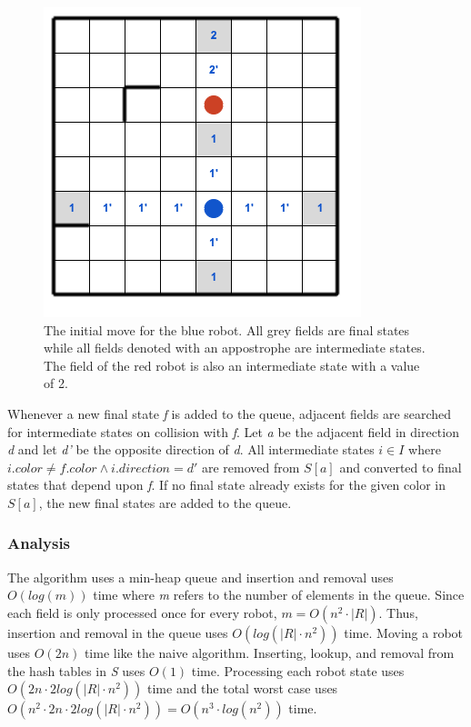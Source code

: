 \documentclass[]{article}
\begin{document}
\begin{figure}[htb]
\centering
\includegraphics[width=0.6\linewidth]{img/stateless.png}
\caption{The initial move for the blue robot. All grey fields are final states while all fields denoted with an appostrophe are intermediate states. The field of the red robot is also an intermediate state with a value of 2.}
\label{fig:stateless}
\end{figure}

Whenever a new final state \emph{f} is added to the queue, adjacent
fields are searched for intermediate states on collision with \emph{f}.
Let \emph{a} be the adjacent field in direction \emph{d} and let
\emph{d'} be the opposite direction of \emph{d}. All intermediate states
\(i \in I\) where \(i.color \neq f.color \land i.direction = d'\) are
removed from \(S[a]\) and converted to final states that depend upon
\emph{f}. If no final state already exists for the given color in
\(S[a]\), the new final states are added to the queue.

\subsubsection{Analysis}\label{analysis}

The algorithm uses a min-heap queue and insertion and removal uses
\(O(log(m))\) time where \emph{m} refers to the number of elements in
the queue. Since each field is only processed once for every robot,
\(m=O(n^2 \cdot |R|)\). Thus, insertion and removal in the queue uses
\(O(log(|R| \cdot n^2))\) time. Moving a robot uses \(O(2n)\) time like
the naive algorithm. Inserting, lookup, and removal from the hash tables
in \emph{S} uses \(O(1)\) time. Processing each robot state uses
\(O(2n \cdot 2log(|R| \cdot n^2))\) time and the total worst case uses
\(O(n^2 \cdot 2n \cdot 2log(|R| \cdot n^2)) = O(n^3 \cdot log(n^2))\)
time.
\end{document}
